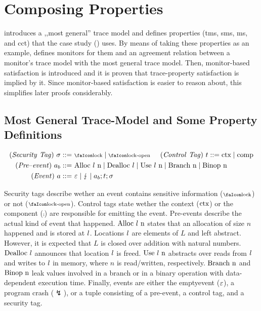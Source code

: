 \documentclass[utf8,acmsmall,review,screen,dvipsnames]{acmart}
\begin{document}
\section{Composing Properties}\label{sec:compprop}
 introduces a ,,most general'' trace model and defines properties (\gls{tms}, \gls{sms}, \gls{ms}, and \gls{cct}) that the case study () uses.
By means of taking these properties as an example,  defines monitors for them and an agreement relation between a monitor's trace model with the most general trace model.
Then, monitor-based satisfaction is introduced and it is proven that trace-property satisfaction is implied by it.
Since monitor-based satisfaction is easier to reason about, this simplifies later proofs considerably.

\subsection{Most General Trace-Model and Some Property Definitions}\label{subsec:propdefs}

\begin{gather*}
  \begin{aligned}
  \mi{(Security\ Tag)}~\sigma\bnfdef&\ \lock \mid \unlock\hspace{0.5cm}
  \mi{(Control\ Tag)}~\sandboxtag\bnfdef \ctx\mid\comp\\
  \mi{(Pre\text{--}event)}~\event[_{b}]\bnfdef&\ \ev{Alloc\ \loc\ n} \mid \ev{Dealloc\ \loc} \mid \ev{Use\ \loc\ n} \mid \ev{Branch\ n} \mid \ev{Binop\ n} \\
  \mi{(Event)}~\event\bnfdef&\ \emptyevent \mid \lightning \mid \event[_{b}];\sandboxtag;\sigma \\
  \end{aligned}
\end{gather*}

Security tags describe wether an event contains sensitive information ($\lock$) or not ($\unlock$).
Control tags state wether the context ($\text{ctx}$) or the component ($\comp$) are responsible for emitting the event.
Pre-events describe the actual kind of event that happened.
$\ev{Alloc\ \loc\ n}$ states that an allocation of size $n$ happened and is stored at $l$.
Locations $l$ are elements of $L$ and left abstract.
However, it is expected that $L$ is closed over addition with natural numbers.
$\text{Dealloc\ \ensuremath l}$ announces that location $l$ is freed.
$\text{Use\ \ensuremath l\ n}$ abstracts over reads from $l$ and writes to $l$ in memory, where $n$ is read/written, respectively.
$\ev{Branch\ n}$ and $\text{Binop\ n}$ leak values involved in a branch or in a binary operation with data-dependent execution time.
Finally, events are either the emptyevent ($\varepsilon$), a program crash ($\lightning$), or a tuple consisting of a pre-event, a control tag, and a security tag.
\end{document}
